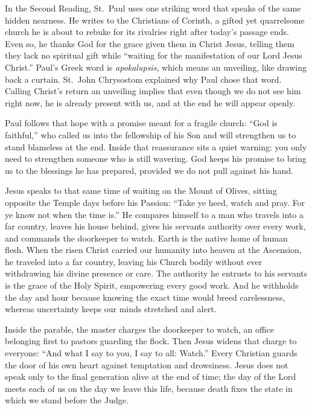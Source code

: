 In the Second Reading, St.~Paul uses one striking word that speaks of the same hidden nearness. He writes to the Christians of Corinth, a gifted yet quarrelsome church he is about to rebuke for its rivalries right after today's passage ends. Even so, he thanks God for the grace given them in Christ Jesus, telling them they lack no spiritual gift while ``waiting for the manifestation of our Lord Jesus Christ.'' Paul's Greek word is \emph{apokalupsis}, which means an unveiling, like drawing back a curtain. St.~John Chrysostom explained why Paul chose that word. Calling Christ's return an unveiling implies that even though we do not see him right now, he is already present with us, and at the end he will appear openly.

Paul follows that hope with a promise meant for a fragile church: ``God is faithful,'' who called us into the fellowship of his Son and will strengthen us to stand blameless at the end. Inside that reassurance sits a quiet warning: you only need to strengthen someone who is still wavering. God keeps his promise to bring us to the blessings he has prepared, provided we do not pull against his hand.

Jesus speaks to that same time of waiting on the Mount of Olives, sitting opposite the Temple days before his Passion: ``Take ye heed, watch and pray. For ye know not when the time is.'' He compares himself to a man who travels into a far country, leaves his house behind, gives his servants authority over every work, and commands the doorkeeper to watch. Earth is the native home of human flesh. When the risen Christ carried our humanity into heaven at the Ascension, he traveled into a far country, leaving his Church bodily without ever withdrawing his divine presence or care. The authority he entrusts to his servants is the grace of the Holy Spirit, empowering every good work. And he withholds the day and hour because knowing the exact time would breed carelessness, whereas uncertainty keeps our minds stretched and alert.

Inside the parable, the master charges the doorkeeper to watch, an office belonging first to pastors guarding the flock. Then Jesus widens that charge to everyone: ``And what I say to you, I say to all: Watch.'' Every Christian guards the door of his own heart against temptation and drowsiness. Jesus does not speak only to the final generation alive at the end of time; the day of the Lord meets each of us on the day we leave this life, because death fixes the state in which we stand before the Judge.

